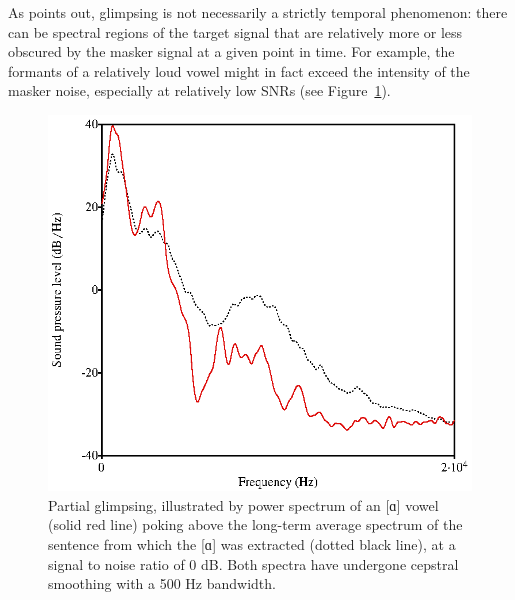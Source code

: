 As \citet{Cooke2006} points out, glimpsing is not necessarily a strictly temporal phenomenon: there can be spectral regions of the target signal that are relatively more or less obscured by the masker signal at a given point in time.  For example, the formants of a relatively loud vowel might in fact exceed the intensity of the masker noise, especially at relatively low SNRs (see Figure~\ref{fig:PartialGlimpsing}).

\begin{figure}[htbp]
	\begin{centering}
	\includegraphics{partialGlimpsing.eps}
	\caption[Partial glimpsing of an {[ɑ]} vowel]{Partial glimpsing, illustrated by power spectrum of an [ɑ] vowel (solid red line) poking above the long-term average spectrum of the sentence from which the [ɑ] was extracted (dotted black line), at a signal to noise ratio of 0 dB. Both spectra have undergone cepstral smoothing with a 500 Hz bandwidth.\label{fig:PartialGlimpsing}}
	\end{centering}
\end{figure}

